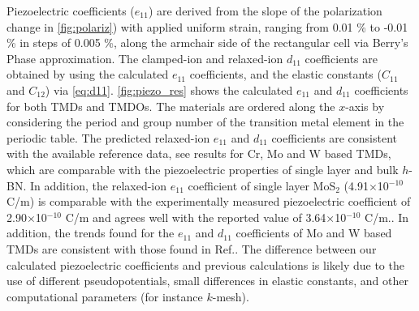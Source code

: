 Piezoelectric coefficients ($e_{11}$) are derived from the slope of the polarization change in \autoref{fig:polariz}) with applied uniform strain, ranging from 0.01 \% to -0.01 \% in steps of 0.005 \%, along the armchair side of the rectangular cell via Berry's Phase approximation\cite{vanderbilt2000}. The clamped-ion and relaxed-ion $d_{11}$ coefficients are obtained by using the calculated $e_{11}$ coefficients, and the elastic constants ($C_{11}$ and $C_{12}$) via \autoref{eq:d11}. \autoref{fig:piezo_res} shows the calculated $e_{11}$ and $d_{11}$ coefficients for both TMDs and TMDOs. The materials are ordered along the $x$-axis by considering the period and group number of the transition metal element in the periodic table. The predicted relaxed-ion $e_{11}$ and $d_{11}$ coefficients are consistent with the available reference data\cite{Duerloo2012,crs2}, see results for Cr, Mo and W based TMDs, which are comparable with the piezoelectric properties of single layer and bulk $h$-BN\cite{Duerloo2012,km-2009,km-2011a,km-2011b}. In addition, the relaxed-ion $e_{11}$ coefficient of single layer MoS$_{2}$ (4.91$\times$10$^{-10}$ C/m) is comparable with the experimentally measured piezoelectric coefficient of 2.90$\times$10$^{-10}$ C/m\cite{Zhu2015} and agrees  well  with the reported value of 3.64$\times$10$^{-10}$ C/m.\cite{Duerloo2012}. In addition, the trends found for the $e_{11}$ and $d_{11}$ coefficients of Mo and W based TMDs are consistent with those found in Ref.\cite{Duerloo2012}. The difference between our calculated piezoelectric coefficients and previous calculations is likely due to the use of different pseudopotentials, small differences in elastic constants, and other computational parameters (for instance $k$-mesh).

